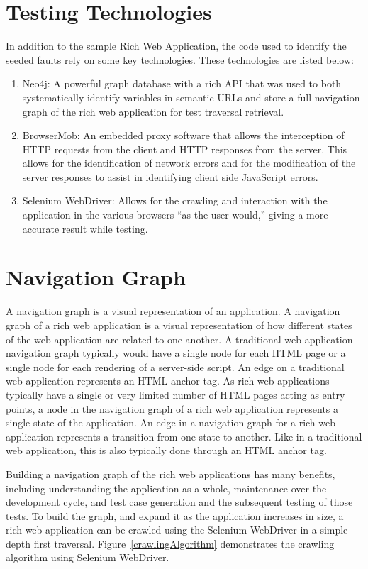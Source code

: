 \section{Testing Technologies}
In addition to the sample Rich Web Application, the code used to identify the seeded faults rely on some key technologies.  These technologies are listed below:

\begin{enumerate}
\item Neo4j: A powerful graph database with a rich API that was used to both systematically identify variables in semantic URLs and store a full navigation graph of the rich web application for test traversal retrieval.

\item BrowserMob: An embedded proxy software that allows the interception of HTTP requests from the client and HTTP responses from the server.  This allows for the identification of network errors and for the modification of the server responses to assist in identifying client side JavaScript errors.

\item Selenium WebDriver: Allows for the crawling and interaction with the application in the various browsers ``as the user would,'' giving a more accurate result while testing.
\end{enumerate}

\section{Navigation Graph}
A navigation graph is a visual representation of an application\cite{herman2000graph}.  A navigation graph of a rich web application is a visual representation of how different states of the web application are related to one another.  A traditional web application navigation graph typically would have a single node for each HTML page or a single node for each rendering of a server-side script.  An edge on a traditional web application represents an HTML anchor tag.  As rich web applications typically have a single or very limited number of HTML pages acting as entry points, a node in the navigation graph of a rich web application represents a single state of the application.  An edge in a navigation graph for a rich web application represents a transition from one state to another.  Like in a traditional web application, this is also typically done through an HTML anchor tag.

Building a navigation graph of the rich web applications has many benefits, including understanding the application as a whole, maintenance over the development cycle, and test case generation and the subsequent testing of those tests\cite{wang09}.  To build the graph, and expand it as the application increases in size, a rich web application can be crawled using the Selenium WebDriver in a simple depth first traversal.  Figure~\ref{crawlingAlgorithm} demonstrates the crawling algorithm using Selenium WebDriver.

